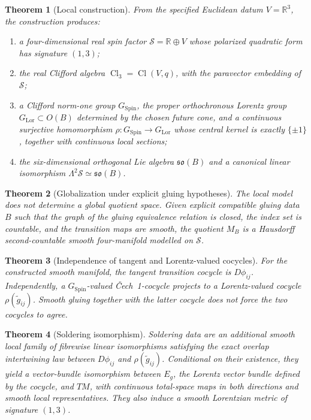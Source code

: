 \documentclass[11pt,a4paper]{article}
\newtheorem{theorem}{Theorem}[section]
\theoremstyle{definition}
\theoremstyle{remark}
\newcommand{\R}{\mathbb{R}}
\newcommand{\Smodel}{\mathcal{S}}
\newcommand{\Cl}{\operatorname{Cl}}
\newcommand{\SpinG}{G_{\mathrm{Spin}}}
\newcommand{\LorG}{G_{\mathrm{Lor}}}
\newcommand{\Cech}{\ifmmode\text{\v{C}ech}\else\v{C}ech\fi}
\newcommand{\soB}{\mathfrak{so}(B)}
\begin{document}
\begin{theorem}[Local construction]
\label{thm:intro-local}
From the specified Euclidean datum \(V=\R^{3}\), the construction produces:
\begin{enumerate}
\item a four-dimensional real spin factor \(\Smodel=\R\oplus V\) whose polarized quadratic form has signature \((1,3)\);
\item the real Clifford algebra \(\Cl_{3}=\Cl(V,q)\), with the paravector
      embedding of \(\Smodel\);
\item a Clifford norm-one group \(\SpinG\), the proper orthochronous Lorentz group \(\LorG\subset O(B)\) determined by the chosen future cone, and a continuous surjective
      homomorphism \(\rho:\SpinG\to\LorG\) whose central kernel is exactly
      \(\{\pm1\}\), together with continuous local sections;
\item the six-dimensional orthogonal Lie algebra \(\soB\) and a canonical linear
      isomorphism \(\Lambda^{2}\Smodel\simeq\soB\).
\end{enumerate}
\end{theorem}

\begin{theorem}[Globalization under explicit gluing hypotheses]
\label{thm:intro-global}
The local model does not determine a global quotient space.  Given explicit compatible gluing data \(B\) such that the graph of the gluing equivalence relation is closed, the index set is countable, and the transition maps are smooth, the quotient \(M_B\) is a Hausdorff second-countable smooth
four-manifold modelled on \(\Smodel\).
\end{theorem}

\begin{theorem}[Independence of tangent and Lorentz-valued cocycles]
\label{thm:intro-independence}
For the constructed smooth manifold, the tangent transition cocycle is \(D\phi_{ij}\).  Independently, a \(\SpinG\)-valued \Cech\ 1-cocycle projects to a Lorentz-valued cocycle \(\rho(\widetilde g_{ij})\).  Smooth gluing together with the latter cocycle does not force the two cocycles to agree.
\end{theorem}

\begin{theorem}[Soldering isomorphism]
\label{thm:intro-solder}
Soldering data are an additional smooth local family of fibrewise linear
isomorphisms satisfying the exact overlap intertwining law between
\(D\phi_{ij}\) and \(\rho(\widetilde g_{ij})\).
Conditional on their existence, they yield a vector-bundle isomorphism between \(E_g\), the Lorentz vector bundle defined by the cocycle, and
\(TM\), with continuous total-space maps in both directions and smooth local representatives.  They
also induce a smooth Lorentzian metric of signature \((1,3)\).
\end{theorem}
\end{document}

